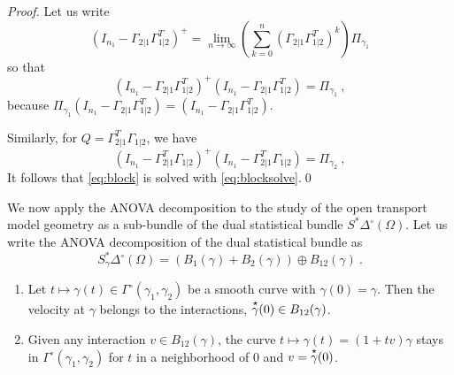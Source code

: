 \documentclass[runningheads]{llncs}
\begin{document}
\begin{proof}
  Let us write
%
\begin{equation*}
  (I_{n_1}-\Gamma_{2|1}\Gamma_{1|2}^T)^{+} = \lim_{n\to\infty} \left(\sum_{k=0}^n (\Gamma_{2|1}\Gamma_{1|2}^T)^k\right) \Pi_{\gamma_1}  
\end{equation*}
%
so that
%
\begin{equation*}
  (I_{n_1}-\Gamma_{2|1}\Gamma_{1|2}^T)^{+}(I_{n_1}-\Gamma_{2|1}\Gamma_{1|2}^T) = \Pi_{\gamma_1} \ ,
\end{equation*}
%
because $\Pi_{\gamma_1} (I_{n_1}-\Gamma_{2|1}\Gamma_{1|2}^T) = (I_{n_1}-\Gamma_{2|1}\Gamma_{1|2}^T)$.

Similarly, for $Q = \Gamma_{2|1}^T\Gamma_{1|2}$, we have
%
\begin{equation*}
  (I_{n_1}-\Gamma_{2|1}^T\Gamma_{1|2})^{+}(I_{n_1}-\Gamma_{2|1}^T\Gamma_{1|2}) = \Pi_{\gamma_2} \ ,
\end{equation*}
%
It follows that \cref{eq:block} is solved with \cref{eq:blocksolve}.\qed
\end{proof}

We now apply the ANOVA decomposition to the study of the open transport model geometry as a sub-bundle of the dual statistical bundle $S^*\Delta^\circ(\Omega)$. Let us write the ANOVA decomposition of the dual statistical bundle as
  \begin{equation*}
    S^*_\gamma \Delta^\circ(\Omega) = (B_1(\gamma) + B_2(\gamma)) \oplus B_{12}(\gamma) \ .
  \end{equation*}
 

  \begin{proposition} \begin{enumerate}\item Let $t \mapsto \gamma(t) \in \Gamma^\circ(\gamma_1,\gamma_2)$ be a smooth curve with $\gamma(0)=\gamma$.   Then the velocity at $\gamma$ belongs to the interactions, $\overset{\star}{\gamma}(0) \in B_{12}(\gamma)$.
      \item Given any interaction $v \in B_{12}(\gamma)$, the curve $t \mapsto \gamma(t) = (1+tv)\gamma$ stays in $\Gamma^\circ(\gamma_1,\gamma_2)$ for $t$ in a neighborhood of 0 and $v = \overset{\star}{\gamma}(0)$.
  \end{enumerate}
\end{proposition}
\end{document}

